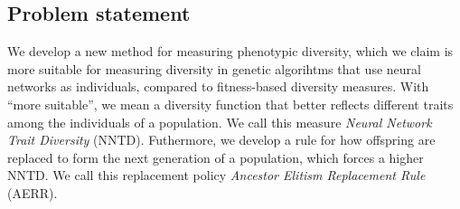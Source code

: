 \subsection{Problem statement}
\label{sec:problemstatement}

We develop a new method for measuring phenotypic diversity, which we claim is more suitable for measuring diversity in genetic algorihtms that use neural networks as individuals, compared to fitness-based diversity measures. With ``more suitable'', we mean a diversity function that better reflects different traits among the individuals of a population. We call this measure \emph{Neural Network Trait Diversity} (NNTD). Futhermore, we develop a rule for how offspring are replaced to form the next generation of a population, which forces a higher NNTD\@. We call this replacement policy \emph{Ancestor Elitism Replacement Rule} (AERR).


